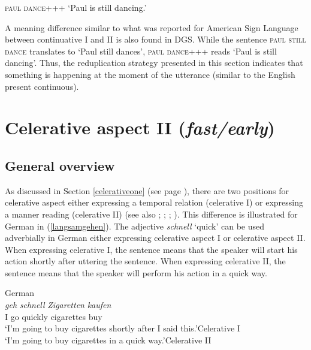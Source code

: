 \begin{exe}
\ex \textsc{paul dance+++}
\glt `Paul is still dancing.' \label{continuativetwodgs}
\end{exe}

\noindent A meaning difference similar to what was reported for American Sign Language between continuative I and II is also found in DGS. While the sentence \textsc{paul still dance} translates to `Paul still dances', \textsc{paul dance+++} reads `Paul is still dancing'. Thus, the reduplication strategy presented in this section indicates that something is happening at the moment of the utterance (similar to the English present continuous).


\section{Celerative aspect II (\textit{fast/early})}\label{celerativetwo}
\subsection{General overview}
As discussed in Section \ref{celerativeone} (see page \pageref{celerativeone}), there are two positions for celerative aspect either expressing a temporal relation (celerative I) or expressing a manner reading (celerative II) (see also \citealt{travis1988syntax}; \citealt[103--104]{cinque1999adverbs}; \citealt{tennyl2000core}; \citealt{ernst2002syntax}). This difference is illustrated for German in (\ref{langsamgehen}). The adjective \textit{schnell} `quick' can be used adverbially in German either expressing celerative aspect I or celerative aspect II. When expressing celerative I, the sentence means that the speaker will start his action shortly after uttering the sentence. When expressing celerative II, the sentence means that the speaker will perform his action in a quick way.



\begin{exe}
\ex German \\  {\textit{geh}} {\textit{schnell}} {\textit{Zigaretten}} {\textit{kaufen}}  \\
{I} {go} {quickly} {cigarettes} {buy}\\
\trans `I'm going to buy cigarettes shortly after I said this.'\hfill{Celerative I}\\
`I'm going to buy cigarettes in a quick way.'\hfill{Celerative II}
\label{langsamgehen}
\end{exe}

